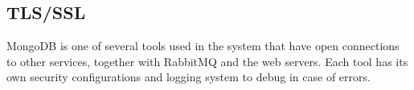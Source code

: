 \documentclass[../Main.tex]{subfiles}
\begin{document}
\subsection{TLS/SSL}
MongoDB is one of several tools used in the system that have open connections to other services, together with RabbitMQ and the web servers. Each tool has its own security configurations and logging system to debug in case of errors. 



\end{document}
